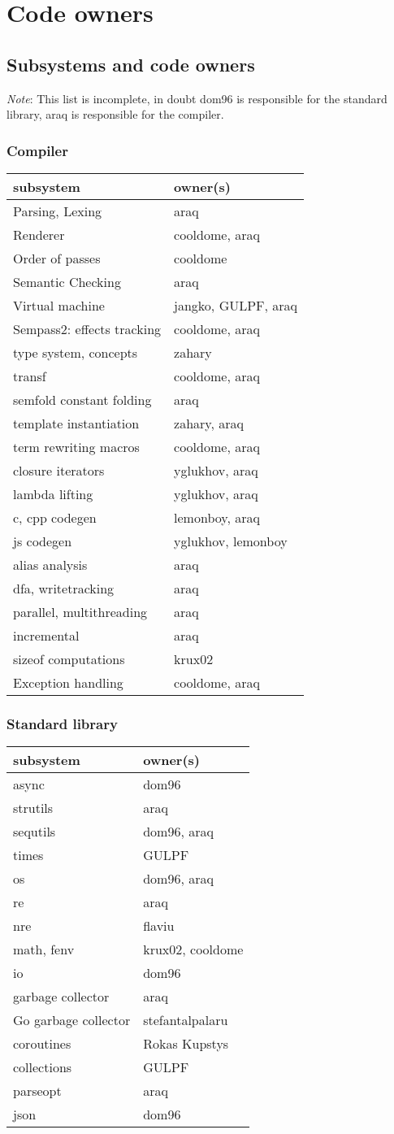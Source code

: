 \hypertarget{code-owners}{%
\section{Code owners}\label{code-owners}}

\hypertarget{subsystems-and-code-owners}{%
\subsection{Subsystems and code
owners}\label{subsystems-and-code-owners}}

\emph{Note}: This list is incomplete, in doubt dom96 is responsible for
the standard library, araq is responsible for the compiler.

\hypertarget{compiler}{%
\subsubsection{Compiler}\label{compiler}}

\begin{longtable}[]{@{}ll@{}}
\toprule
subsystem & owner(s)\tabularnewline
\midrule
\endhead
Parsing, Lexing & araq\tabularnewline
Renderer & cooldome, araq\tabularnewline
Order of passes & cooldome\tabularnewline
Semantic Checking & araq\tabularnewline
Virtual machine & jangko, GULPF, araq\tabularnewline
Sempass2: effects tracking & cooldome, araq\tabularnewline
type system, concepts & zahary\tabularnewline
transf & cooldome, araq\tabularnewline
semfold constant folding & araq\tabularnewline
template instantiation & zahary, araq\tabularnewline
term rewriting macros & cooldome, araq\tabularnewline
closure iterators & yglukhov, araq\tabularnewline
lambda lifting & yglukhov, araq\tabularnewline
c, cpp codegen & lemonboy, araq\tabularnewline
js codegen & yglukhov, lemonboy\tabularnewline
alias analysis & araq\tabularnewline
dfa, writetracking & araq\tabularnewline
parallel, multithreading & araq\tabularnewline
incremental & araq\tabularnewline
sizeof computations & krux02\tabularnewline
Exception handling & cooldome, araq\tabularnewline
\bottomrule
\end{longtable}

\hypertarget{standard-library}{%
\subsubsection{Standard library}\label{standard-library}}

\begin{longtable}[]{@{}ll@{}}
\toprule
subsystem & owner(s)\tabularnewline
\midrule
\endhead
async & dom96\tabularnewline
strutils & araq\tabularnewline
sequtils & dom96, araq\tabularnewline
times & GULPF\tabularnewline
os & dom96, araq\tabularnewline
re & araq\tabularnewline
nre & flaviu\tabularnewline
math, fenv & krux02, cooldome\tabularnewline
io & dom96\tabularnewline
garbage collector & araq\tabularnewline
Go garbage collector & stefantalpalaru\tabularnewline
coroutines & Rokas Kupstys\tabularnewline
collections & GULPF\tabularnewline
parseopt & araq\tabularnewline
json & dom96\tabularnewline
\bottomrule
\end{longtable}
